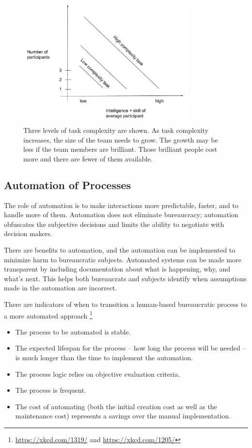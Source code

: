\begin{figure}
\includegraphics[width=0.8\textwidth]{images/people-per-task-for-skill-level.pdf}
\caption{Three levels of task complexity are shown. As task complexity increases, the size of the team needs to grow. The growth may be less if the team members are brilliant. Those brilliant people cost more and there are fewer of them available.}
\label{fig:complexity-and-size}
\end{figure}


\subsection{Automation of Processes}

The role of automation is to make interactions more predictable, faster, and to handle more of them. Automation does not eliminate bureaucracy; automation obfuscates the subjective decisions and limits the ability to negotiate with decision makers.

There are benefits to automation, and the automation can be implemented to minimize harm to bureaucratic subjects.  Automated systems can be made more transparent by including documentation about what is happening, why, and what's next.
This helps both bureaucrats and subjects identify when assumptions made in the automation are incorrect. 


There are indicators of when to transition a human-based bureaucratic process to a more automated approach
\footnote{\href{https://xkcd.com/1319/}{https://xkcd.com/1319/} and \href{https://xkcd.com/1205/}{https://xkcd.com/1205/}}
\begin{itemize}
    \item The process to be automated is stable.
    \item The expected lifespan for the process -- how long the process will be needed -- is much longer than the time to implement the automation.
\item The process logic relies on objective evaluation criteria.  
\item The process is frequent.
\item The cost of automating (both the initial creation cost as well as the maintenance cost) represents a savings over the manual implementation.
\end{itemize}


